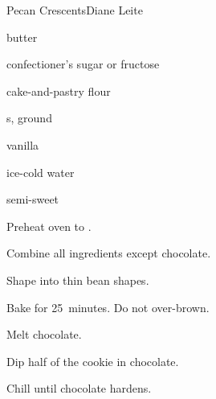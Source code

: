 \begin{recipe}{Pecan Crescents}{Diane Leite}{}

\begin{ingredients}
\item \lbs{\half} butter
\item \C{\half} confectioner's sugar or fructose
\item {} cake-and-pastry flour
\item {} s, ground
\item {} vanilla
\item {} ice-cold water
\item semi-sweet 
\end{ingredients}

\begin{directions}
\item Preheat oven to .
\item Combine all ingredients except chocolate.
\item Shape into thin bean shapes.
\item Bake for 25~minutes. Do not over-brown.
\item Melt chocolate.
\item Dip half of the cookie in chocolate.
\item Chill until chocolate hardens.
\end{directions}

\end{recipe}
